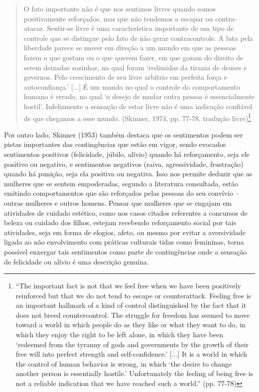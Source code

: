 \begin{quote}
    O fato importante não é que nos sentimos livres quando somos positivamente reforçados, mas que não tendemos a escapar ou contra-atacar. Sentir-se livre é uma característica importante de um tipo de controle que se distingue pelo fato de não gerar contracontrole. A luta pela liberdade parece se mover em direção a um mundo em que as pessoas fazem o que gostam ou o que querem fazer, em que gozam do direito de serem deixadas sozinhas, na qual foram ‘redimidas da tirania de deuses e governos. Pelo crescimento de seu livre arbítrio em perfeita força e autoconfiança.’ [...] É um mundo no qual o controle do comportamento humano é errado, no qual ‘o desejo de mudar outra pessoa é essencialmente hostil’. Infelizmente a sensação de estar livre não é uma indicação confiável de que chegamos a esse mundo. (Skinner, 1974, pp. 77-78, tradução livre)\footnote{``The important fact is not that we feel free when we have been positively reinforced but that we do not tend to escape or counterattack. Feeling free is an important hallmark of a kind of control distinguished by the fact that it does not breed countercontrol. The struggle for freedom has seemed to move toward a world in which people do as they like or what they want to do, in which they enjoy the right to be left alone, in which they have been ‘redeemed from the tyranny of gods and governments by the growth of their free will into perfect strength and self-confidence.’ [...] It is a world in which the control of human behavior is wrong, in which ‘the desire to change another person is essentially hostile.’ Unfortunately the feeling of being free is not a reliable indication that we have reached such a world.'' (pp. 77-78)}
\end{quote}

Por outro lado, Skinner (1953) também destaca que os sentimentos podem ser pistas importantes das contingências que estão em vigor, sendo evocados sentimentos positivos (felicidade, júbilo, alívio) quando há reforçamento, seja ele positivo ou negativo, e sentimentos negativos (raiva, agressividade, frustração) quando há punição, seja ela positiva ou negativa. Isso nos permite deduzir que as mulheres que se sentem empoderadas, segundo a literatura consultada, estão emitindo comportamentos que são reforçados pelas pessoas do seu convívio – outras mulheres e outros homens. Pensar que mulheres que se engajam em atividades de cuidado estético, como nos casos citados referentes a concursos de beleza ou cuidado dos filhos, estejam recebendo reforçamento social por tais atividades, seja em forma de elogios, afeto, ou mesmo por evitar a aversividade ligada ao não envolvimento com práticas culturais tidas como femininas, torna possível enxergar tais sentimentos como parte de contingências onde a sensação de felicidade ou alívio é uma descrição genuína.


